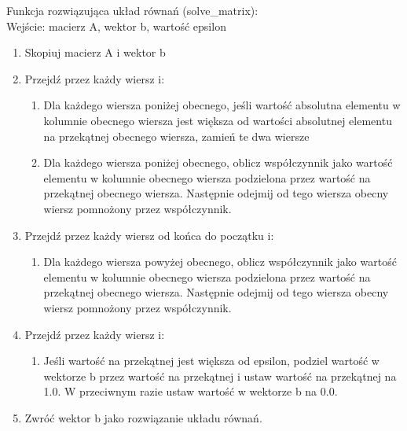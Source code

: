 \documentclass[a4paper]{article}
\begin{document}
Funkcja rozwiązująca układ równań (solve\_matrix):\\
Wejście: macierz A, wektor b, wartość epsilon
\begin{enumerate}
    \item Skopiuj macierz A i wektor b
    \item Przejdź przez każdy wiersz i:
          \begin{enumerate}
              \item Dla każdego wiersza poniżej obecnego, jeśli wartość absolutna elementu w kolumnie obecnego wiersza jest większa od wartości absolutnej elementu na przekątnej obecnego wiersza, zamień te dwa wiersze
              \item Dla każdego wiersza poniżej obecnego, oblicz współczynnik jako wartość elementu w kolumnie obecnego wiersza podzielona przez wartość na przekątnej obecnego wiersza. Następnie odejmij od tego wiersza obecny wiersz pomnożony przez współczynnik.
          \end{enumerate}
    \item Przejdź przez każdy wiersz od końca do początku i:
          \begin{enumerate}
              \item Dla każdego wiersza powyżej obecnego, oblicz współczynnik jako wartość elementu w kolumnie obecnego wiersza podzielona przez wartość na przekątnej obecnego wiersza. Następnie odejmij od tego wiersza obecny wiersz pomnożony przez współczynnik.
          \end{enumerate}
    \item Przejdź przez każdy wiersz i:
          \begin{enumerate}
              \item Jeśli wartość na przekątnej jest większa od epsilon, podziel wartość w wektorze b przez wartość na przekątnej i ustaw wartość na przekątnej na 1.0. W przeciwnym razie ustaw wartość w wektorze b na 0.0.
          \end{enumerate}
    \item Zwróć wektor b jako rozwiązanie układu równań.
\end{enumerate}
\end{document}
